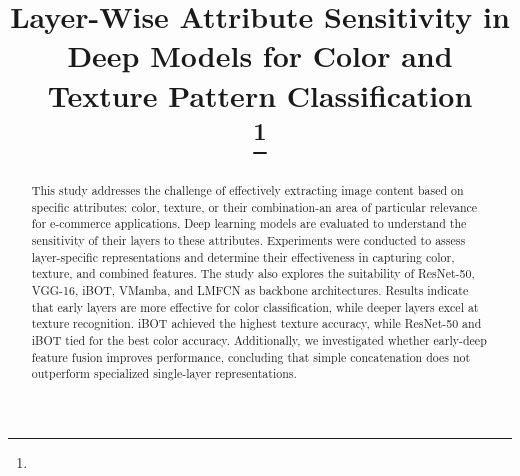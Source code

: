 \documentclass[conference]{IEEEtran}
\begin{document}
\title{Layer-Wise Attribute Sensitivity in Deep Models for Color and Texture Pattern Classification\\
\thanks{}
}

\author{}



\maketitle

\begin{abstract}
This study addresses the challenge of effectively extracting image content based on specific attributes: color, texture, or their combination-an area of particular relevance for e-commerce applications. Deep learning models are evaluated to understand the sensitivity of their layers to these attributes. Experiments were conducted to assess layer-specific representations and determine their effectiveness in capturing color, texture, and combined features. The study also explores the suitability of ResNet-50, VGG-16, iBOT, VMamba, and LMFCN as backbone architectures. Results indicate that early layers are more effective for color classification, while deeper layers excel at texture recognition. iBOT achieved the highest texture accuracy, while ResNet-50 and iBOT tied for the best color accuracy. Additionally, we investigated whether early-deep feature fusion improves performance, concluding that simple concatenation does not outperform specialized single-layer representations.
\end{abstract}
\end{document}
